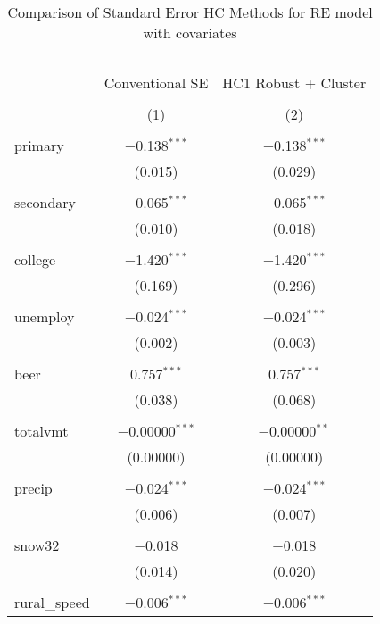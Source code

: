 \documentclass{article}
\begin{document}
\begin{table}[!htbp] \centering 
  \caption{Comparison of Standard Error HC Methods for RE model with covariates} 
  \label{tab:p3e} 
\footnotesize 
\begin{tabular}{@{\extracolsep{5pt}}lcc} 
\\[-1.8ex]\hline 
\hline \\[-1.8ex] 
\\[-1.8ex] & \multicolumn{2}{c}{ } \\ 
 & Conventional SE & HC1 Robust + Cluster \\ 
\\[-1.8ex] & (1) & (2)\\ 
\hline \\[-1.8ex] 
 primary & $-$0.138$^{***}$ & $-$0.138$^{***}$ \\ 
  & (0.015) & (0.029) \\ 
  & & \\ 
 secondary & $-$0.065$^{***}$ & $-$0.065$^{***}$ \\ 
  & (0.010) & (0.018) \\ 
  & & \\ 
 college & $-$1.420$^{***}$ & $-$1.420$^{***}$ \\ 
  & (0.169) & (0.296) \\ 
  & & \\ 
 unemploy & $-$0.024$^{***}$ & $-$0.024$^{***}$ \\ 
  & (0.002) & (0.003) \\ 
  & & \\ 
 beer & 0.757$^{***}$ & 0.757$^{***}$ \\ 
  & (0.038) & (0.068) \\ 
  & & \\ 
 totalvmt & $-$0.00000$^{***}$ & $-$0.00000$^{**}$ \\ 
  & (0.00000) & (0.00000) \\ 
  & & \\ 
 precip & $-$0.024$^{***}$ & $-$0.024$^{***}$ \\ 
  & (0.006) & (0.007) \\ 
  & & \\ 
 snow32 & $-$0.018 & $-$0.018 \\ 
  & (0.014) & (0.020) \\ 
  & & \\ 
 rural\_speed & $-$0.006$^{***}$ & $-$0.006$^{***}$ \\ 

\end{tabular}
\end{table}
\end{document}
